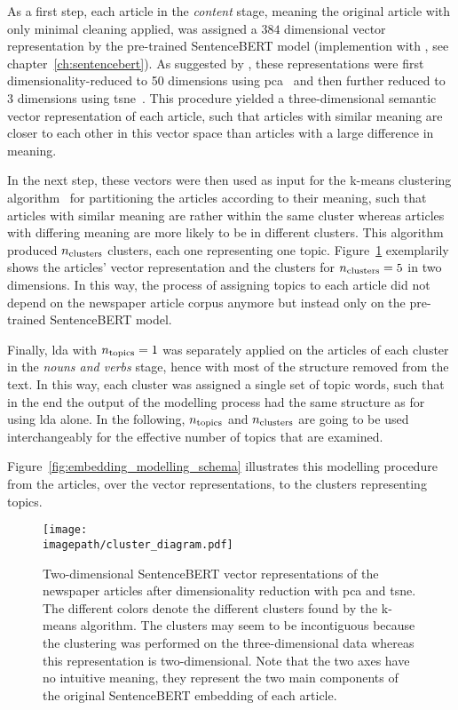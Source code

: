 As a first step, each article in the \textit{content} stage, meaning the original article with only minimal cleaning applied, was assigned a $384$ dimensional vector representation by the pre-trained SentenceBERT model (implemention with \textcite{sbertsentencetransformers_sentencetransformers_nodate}, see chapter~\ref{ch:sentencebert}). As suggested by \textcite{black_using_2020}, these representations were first dimensionality-reduced to \SI{50}{} dimensions using \gls{pca}~\autocite{pearson_liii_1901} and then further reduced to \SI{3}{} dimensions using \gls{tsne}~\autocite{maaten_visualizing_2008}. This procedure yielded a three-dimensional semantic vector representation of each article, such that articles with similar meaning are closer to each other in this vector space than articles with a large difference in meaning.

In the next step, these vectors were then used as input for the k-means clustering algorithm~\autocite{macqueen_methods_1967} for partitioning the articles according to their meaning, such that articles with similar meaning are rather within the same cluster whereas articles with differing meaning are more likely to be in different clusters. This algorithm produced $n_\text{clusters}$ clusters, each one representing one topic. Figure~\ref{fig:clusters} exemplarily shows the articles' vector representation and the clusters for $n_\text{clusters}=5$ in two dimensions. In this way, the process of assigning topics to each article did not depend on the newspaper article corpus anymore but instead only on the pre-trained SentenceBERT model.

Finally, \gls{lda} with $n_\text{topics}=1$ was separately applied on the articles of each cluster in the \textit{nouns and verbs} stage, hence with most of the structure removed from the text. In this way, each cluster was assigned a single set of topic words, such that in the end the output of the modelling process had the same structure as for using \gls{lda} alone. In the following, $n_\text{topics}$ and $n_\text{clusters}$ are going to be used interchangeably for the effective number of topics that are examined.

Figure~\ref{fig:embedding_modelling_schema} illustrates this modelling procedure from the articles, over the vector representations, to the clusters representing topics.

\begin{figure}
    \centering
    \texttt{[image: \\imagepath/cluster\_diagram.pdf]}
    \caption{Two-dimensional SentenceBERT vector representations of the newspaper articles after dimensionality reduction with \gls{pca} and \gls{tsne}. The different colors denote the different clusters found by the k-means algorithm. The clusters may seem to be incontiguous because the clustering was performed on the three-dimensional data whereas this representation is two-dimensional. Note that the two axes have no intuitive meaning, they represent the two main components of the original SentenceBERT embedding of each article.}\label{fig:clusters}
\end{figure}

